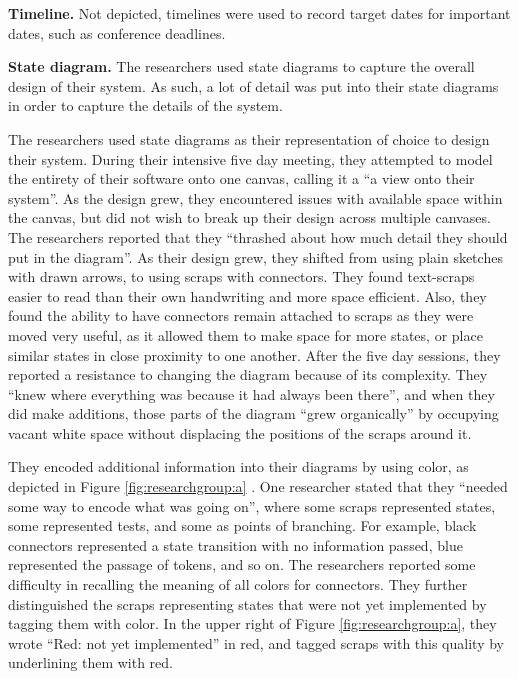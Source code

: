 \textbf{Timeline. } Not depicted, timelines were used to record target dates for important dates, such as conference deadlines.

\textbf{State diagram. } The researchers used state diagrams to capture the overall design of their system. As such, a lot of detail was put into their state diagrams in order to capture the details of the system.

The researchers used state diagrams as their representation of choice to design their system. During their intensive five day meeting, they attempted to model the entirety of their software onto one canvas, calling it a ``a view onto their system''. As the design grew, they encountered issues with available space within the canvas, but did not wish to break up their design across multiple canvases. The researchers reported that they ``thrashed about how much detail they should put in the diagram''. As their design grew, they shifted from using plain sketches with drawn arrows, to using scraps with connectors. They found text-scraps easier to read than their own handwriting and more space efficient. Also, they found the ability to have connectors remain attached to scraps as they were moved very useful, as it allowed them to make space for more states, or place similar states in close proximity to one another. After the five day sessions, they reported a resistance to changing the diagram because of its complexity. They ``knew where everything was because it had always been there'', and when they did make additions, those parts of the diagram ``grew organically'' by occupying vacant white space without displacing the positions of the scraps around it.

They encoded additional information into their diagrams by using color, as depicted in Figure \ref{fig:researchgroup:a} . One researcher stated that they ``needed some way to encode what was going on'', where some scraps represented states, some represented tests, and some as points of branching. For example, black connectors represented a state transition with no information passed, blue represented the passage of tokens, and so on. The researchers reported some difficulty in recalling the meaning of all colors for connectors. They further distinguished the scraps representing states that were not yet implemented by tagging them with color. In the upper right of Figure \ref{fig:researchgroup:a}, they wrote ``Red: not yet implemented'' in red, and tagged scraps with this quality by underlining them with red. 

